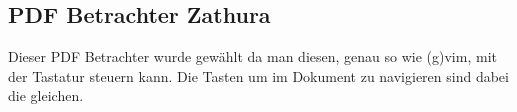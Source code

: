 \subsection{PDF Betrachter Zathura}
\label{ssec:zathura}

Dieser PDF Betrachter wurde gewählt da man diesen,
genau so wie (g)vim,
mit der Tastatur steuern kann.
Die Tasten um im Dokument zu navigieren sind dabei die gleichen.
